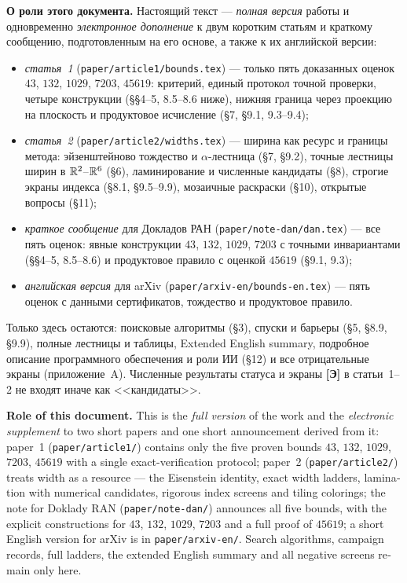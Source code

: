 \begin{keybox}
\noindent\textbf{О роли этого документа.} Настоящий текст --- \emph{полная
версия} работы и одновременно \emph{электронное дополнение} к двум коротким
статьям и краткому сообщению, подготовленным на его основе, а также к их
английской версии:
\begin{itemize}[leftmargin=1.4em,itemsep=1pt,topsep=2pt]
\item \emph{статья~1} (\texttt{paper/article1/bounds.tex}) --- только пять
доказанных оценок $43$, $132$, $1029$, $7203$, $45619$: критерий, единый
протокол точной проверки, четыре конструкции (\S\S4--5, 8.5--8.6 ниже),
нижняя граница через проекцию на плоскость и продуктовое исчисление (\S7, \S9.1, 9.3--9.4);
\item \emph{статья~2} (\texttt{paper/article2/widths.tex}) --- ширина как
ресурс и границы метода: эйзенштейново тождество и $\alpha$-лестница (\S7,
\S9.2), точные лестницы ширин в $\mathbb{R}^2$--$\mathbb{R}^6$ (\S6), ламинирование и
численные кандидаты (\S8), строгие экраны индекса (\S8.1, \S9.5--9.9),
мозаичные раскраски (\S10), открытые вопросы (\S11);
\item \emph{краткое сообщение} для Докладов РАН (\texttt{paper/note-dan/dan.tex}) ---
все пять оценок: явные конструкции $43$, $132$, $1029$, $7203$ с точными
инвариантами (\S\S4--5, 8.5--8.6) и продуктовое правило с оценкой $45619$
(\S9.1, 9.3);
\item \emph{английская версия} для arXiv (\texttt{paper/arxiv-en/bounds-en.tex}) ---
пять оценок с данными сертификатов, тождество и продуктовое правило.
\end{itemize}
Только здесь остаются: поисковые алгоритмы (\S3), спуски и барьеры
(\S5, \S8.9, \S9.9), полные лестницы и таблицы, Extended English summary,
подробное описание программного обеспечения и роли ИИ (\S12) и все
отрицательные экраны (приложение~A). Численные результаты статуса \stN{} и
экраны \textbf{[Э]} в статьи~1--2 не входят иначе как <<кандидаты>>.
\end{keybox}

\begin{otherlanguage}{english}
\noindent\textbf{Role of this document.} This is the \emph{full version} of
the work and the \emph{electronic supplement} to two short papers and one
short announcement derived from it: paper~1
(\texttt{paper/article1/}) contains only the five proven bounds $43$, $132$,
$1029$, $7203$, $45619$ with a single exact-verification protocol; paper~2
(\texttt{paper/article2/}) treats width as a resource --- the Eisenstein
identity, exact width ladders, lamination with numerical candidates,
rigorous index screens and tiling colorings; the note for Doklady RAN
(\texttt{paper/note-dan/}) announces all five bounds, with the explicit
constructions for $43$, $132$, $1029$, $7203$ and a full proof of $45619$;
a short English version for arXiv is in \texttt{paper/arxiv-en/}.
Search algorithms, campaign records, full ladders, the extended English
summary and all negative screens remain only here.
\end{otherlanguage}
\medskip
